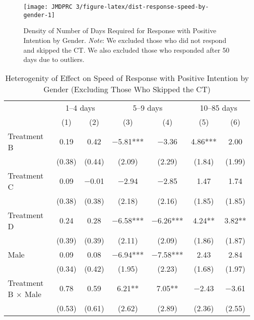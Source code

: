 \documentclass[12pt, a4paper]{article}
\begin{document}
\begin{figure}[H]
\texttt{[image: JMDPRC~3/figure-latex/dist-response-speed-by-gender-1]} \caption{Density of Number of Days Required for Response with Positive Intention by Gender. \newline \emph{Note}: We excluded those who did not respond and skipped the CT. We also excluded those who responded after 50 days due to outliers.}\label{fig:dist-response-speed-by-gender}
\end{figure}

\begin{table}[H]

\caption{\label{tab:lm-interaction-gender-int-time-decompose-noskip}Heterogenity of Effect on Speed of Response with Positive Intention by Gender (Excluding Those Who Skipped the CT)}
\centering
\fontsize{8}{10}\selectfont
\begin{threeparttable}
\begin{tabular}[t]{lcccccc}
\toprule
\multicolumn{1}{c}{ } & \multicolumn{2}{c}{1--4 days} & \multicolumn{2}{c}{5--9 days} & \multicolumn{2}{c}{10--85 days} \\
\cmidrule(l{3pt}r{3pt}){2-3} \cmidrule(l{3pt}r{3pt}){4-5} \cmidrule(l{3pt}r{3pt}){6-7}
  & (1) & (2) & (3) & (4) & (5) & (6)\\
\midrule
Treatment B & \num{0.19} & \num{0.42} & \num{-5.81}*** & \num{-3.36} & \num{4.86}*** & \num{2.00}\\
 & (\num{0.38}) & (\num{0.44}) & (\num{2.09}) & (\num{2.29}) & (\num{1.84}) & (\num{1.99})\\
Treatment C & \num{0.09} & \num{-0.01} & \num{-2.94} & \num{-2.85} & \num{1.47} & \num{1.74}\\
 & (\num{0.38}) & (\num{0.38}) & (\num{2.18}) & (\num{2.16}) & (\num{1.85}) & (\num{1.85})\\
Treatment D & \num{0.24} & \num{0.28} & \num{-6.58}*** & \num{-6.26}*** & \num{4.24}** & \num{3.82}**\\
 & (\num{0.39}) & (\num{0.39}) & (\num{2.11}) & (\num{2.09}) & (\num{1.86}) & (\num{1.87})\\
Male & \num{0.09} & \num{0.08} & \num{-6.94}*** & \num{-7.58}*** & \num{2.43} & \num{2.84}\\
 & (\num{0.34}) & (\num{0.42}) & (\num{1.95}) & (\num{2.23}) & (\num{1.68}) & (\num{1.97})\\
Treatment B $\times$ Male & \num{0.78} & \num{0.59} & \num{6.21}** & \num{7.05}** & \num{-2.43} & \num{-3.61}\\
 & (\num{0.53}) & (\num{0.61}) & (\num{2.62}) & (\num{2.89}) & (\num{2.36}) & (\num{2.55})\\

\end{tabular}
\end{threeparttable}
\end{table}
\end{document}
